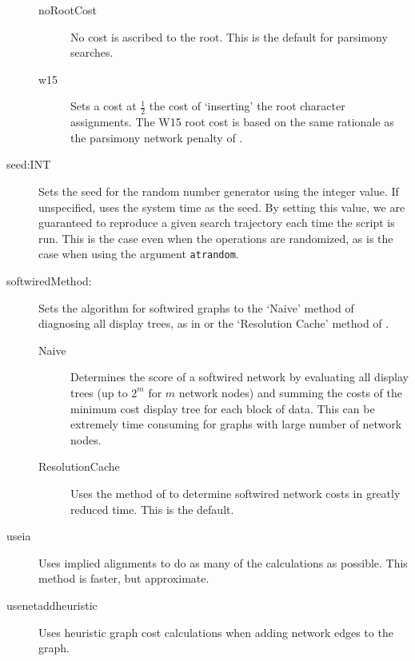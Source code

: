 \begin{description}
		\begin{description}
			
			\item[noRootCost]  No cost is ascribed to the root. This is the default for parsimony searches.
			
			\item[w15] Sets a cost at $\frac{1}{2}$ the cost of `inserting' the root character 
			assignments. The W15 root cost is based on the same rationale as the parsimony 
			network penalty of  \cite{Wheeler2015}.

		\end{description}
			 
		 \item[seed:INT] Sets the seed for the random number generator using the integer
		 value. If unspecified, \phyg uses the system time as the seed. By setting this value, 
		 we are guaranteed to reproduce a given search trajectory each time the script is run. 
		 This is the case even when the operations are randomized, as is the case when using 
		 the argument \texttt{atrandom}.
			 
		 \item[softwiredMethod:] Sets the algorithm for softwired graphs to the 
		 `Naive' method of diagnosing all display trees, as in \cite{Wheeler2015} or
		 the `Resolution Cache' method of \cite{WheelerandWashburn2023}.
		 
		\begin{description}
			
			\item[Naive] Determines the score of a softwired network by evaluating all display 
			trees (up to $2^m$ for $m$ network nodes) and summing the costs of the minimum 
			cost display tree for each block of data. This can be extremely time consuming for 
			graphs with large number of network nodes.
			
			\item[ResolutionCache] Uses the method of \citep{WheelerandWashburn2023} to 
			determine softwired network costs in greatly reduced time.  This is the default.
			
		\end{description}
		

		\item[useia] Uses implied alignments to do as many of the calculations as possible.
		This method is faster, but approximate. 
		
		\item[usenetaddheuristic]	Uses heuristic graph cost calculations when adding network
		edges to the graph.
		
	\end{description}
					
